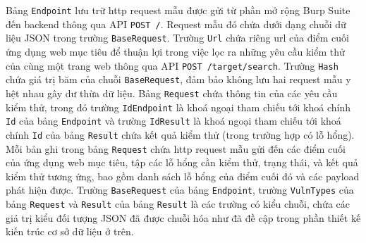 Bảng \texttt{Endpoint} lưu trữ \acrshort{http} request mẫu được gửi từ phần mở rộng Burp Suite đến backend thông qua API \colorbox{gray!30}{\texttt{POST /}}. Request mẫu đó chứa dưới dạng chuỗi dữ liệu JSON trong trường \texttt{BaseRequest}. Trường \texttt{Url} chứa riêng \acrshort{url} của điểm cuối ứng dụng web mục tiêu để thuận lợi trong việc lọc ra những yêu cầu kiểm thử của cùng một trang web thông qua API \colorbox{gray!30}{\texttt{POST /target/search}}. Trường \texttt{Hash} chứa giá trị băm của chuỗi \texttt{BaseRequest}, đảm bảo không lưu hai request mẫu y hệt nhau gây dư thừa dữ liệu. Bảng \texttt{Request} chứa thông tin của các yêu cầu kiểm thử, trong đó trường \texttt{IdEndpoint} là khoá ngoại tham chiếu tới khoá chính \texttt{Id} của bảng \texttt{Endpoint} và trường \texttt{IdResult} là khoá ngoại tham chiếu tới khoá chính \texttt{Id} của bảng \texttt{Result} chứa kết quả kiểm thử (trong trường hợp có lỗ hổng). Mỗi bản ghi trong bảng \texttt{Request} chứa \acrshort{http} request mẫu gửi đến các điểm cuối của ứng dụng web mục tiêu, tập các lỗ hổng cần kiểm thử, trạng thái, và kết quả kiểm thử tương ứng, bao gồm danh sách lỗ hổng của điểm cuối đó và các payload phát hiện được. Trường \texttt{BaseRequest} của bảng \texttt{Endpoint}, trường \texttt{VulnTypes} của bảng \texttt{Request} và \texttt{Result} của bảng \texttt{Result} là các trường có kiểu chuỗi, chứa các giá trị kiểu đối tượng JSON đã được chuỗi hóa như đã đề cập trong phần thiết kế kiến trúc cơ sở dữ liệu ở trên.